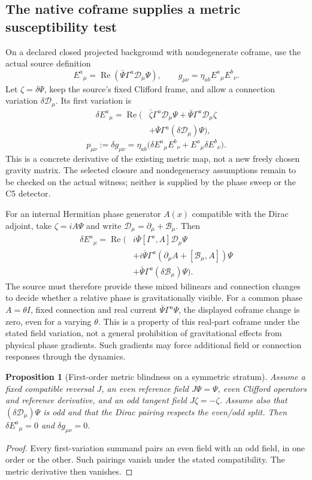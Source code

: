 \documentclass[11pt,a4paper]{article}
\newtheorem{proposition}{Proposition}
\begin{document}
\subsection{The native coframe supplies a metric susceptibility test}
On a declared closed projected background with nondegenerate coframe,
use the actual source definition
\[
 E^a{}_{\mu}=\operatorname{Re}
 (\bar\Psi\Gamma^a\mathcal D_\mu\Psi),\qquad
 g_{\mu\nu}=\eta_{ab}E^a{}_{\mu}E^b{}_{\nu}.
\]
Let $\zeta=\delta\Psi$, keep the source's fixed Clifford frame,
and allow a connection variation $\delta\mathcal D_\mu$.
Its first variation is
\[
 \begin{aligned}
 \delta E^a{}_{\mu}=\operatorname{Re}\bigl(&
 \bar\zeta\Gamma^a\mathcal D_\mu\Psi
 +\bar\Psi\Gamma^a\mathcal D_\mu\zeta\\
 &+\bar\Psi\Gamma^a(\delta\mathcal D_\mu)\Psi\bigr),
 \end{aligned}
\]
\[
 p_{\mu\nu}:=\delta g_{\mu\nu}
 =\eta_{ab}\bigl(\delta E^a{}_{\mu}E^b{}_{\nu}
 +E^a{}_{\mu}\delta E^b{}_{\nu}\bigr).
\]
This is a concrete derivative of the existing metric map, not a
new freely chosen gravity matrix. The selected closure and
nondegeneracy assumptions remain to be checked on the actual witness;
neither is supplied by the phase sweep or the C5 detector.

For an internal Hermitian phase generator $A(x)$ compatible with
the Dirac adjoint, take $\zeta=iA\Psi$ and write
$\mathcal D_\mu=\partial_\mu+\mathcal B_\mu$. Then
\[
 \begin{aligned}
 \delta E^a{}_{\mu}=\operatorname{Re}\bigl(&
 i\bar\Psi[\Gamma^a,A]\mathcal D_\mu\Psi\\
 &+i\bar\Psi\Gamma^a
 (\partial_\mu A+[\mathcal B_\mu,A])\Psi\\
 &+\bar\Psi\Gamma^a(\delta\mathcal B_\mu)\Psi\bigr).
 \end{aligned}
\]
The source must therefore provide these mixed bilinears and
connection changes to decide whether a relative phase is
gravitationally visible. For a common phase $A=\theta I$,
fixed connection and real current $\bar\Psi\Gamma^a\Psi$, the
displayed coframe change is zero, even for a varying $\theta$.
This is a property of this real-part coframe under the stated
field variation, not a general prohibition of gravitational
effects from physical phase gradients. Such gradients may force
additional field or connection responses through the dynamics.

\begin{proposition}[First-order metric blindness on a symmetric stratum]
Assume a fixed compatible reversal $J$, an even reference field
$J\Psi=\Psi$, even Clifford operators and reference derivative,
and an odd tangent field $J\zeta=-\zeta$. Assume also that
$(\delta\mathcal D_\mu)\Psi$ is odd and that the Dirac pairing
respects the even/odd split. Then $\delta E^a{}_{\mu}=0$ and
$\delta g_{\mu\nu}=0$.
\end{proposition}
\begin{proof}
Every first-variation summand pairs an even field with an odd
field, in one order or the other. Such pairings vanish under
the stated compatibility. The metric derivative then vanishes.
\end{proof}
\end{document}
